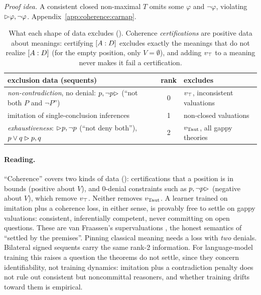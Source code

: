 \noindent\emph{Proof idea.} A consistent closed non-maximal $T$ omits some $\varphi$ and $\neg\varphi$, violating $\rhd\varphi,\neg\varphi$. Appendix~\ref{app:coherence:carnap}.

\begin{table}[t]
\centering\small
\begin{tabularx}{\textwidth}{@{}Xcl@{}}
\toprule
exclusion data (sequents) & rank & excludes\\
\midrule
\emph{non-contradiction}, no denial: $p,\neg p\rhd$ (``not both $P$ and $\neg P$'') & 0 & $v_{\top}$, inconsistent valuations\\
imitation of single-conclusion inferences & 1 & non-closed valuations\\
\emph{exhaustiveness}: $\rhd p,\neg p$ (``not deny both''), $p\vee q\rhd p,q$ & 2 & $v_{\mathrm{Taut}}$, all gappy theories\\
\bottomrule
\end{tabularx}
\caption{What each shape of data excludes (). Coherence \emph{certifications} are positive data about meanings: certifying $[A : D]$ excludes exactly the meanings that do not realize $[A : D]$ (for the empty position, only $V=\emptyset$), and adding $v_{\top}$ to a meaning never makes it fail a certification.}
\label{tab:coherence:rank}
\end{table}

\paragraph{Reading.} ``Coherence'' covers two kinds of data (): certifications that a position is in bounds (positive about $V$), and 0-denial constraints such as $p,\neg p\rhd$ (negative about $V$), which remove $v_{\top}$. Neither removes $v_{\mathrm{Taut}}$. A learner trained on imitation plus a coherence loss, in either sense, is provably free to settle on gappy valuations: consistent, inferentially competent, never committing on open questions. These are van Fraassen's supervaluations \citep{vanfraassen1966singular}, the honest semantics of ``settled by the premises''. Pinning classical meaning needs a loss with \emph{two} denials. Bilateral signed sequents \citep{smiley1996rejection,rumfitt2000yes} carry the same rank-2 information. For language-model training this raises a question the theorems do not settle, since they concern identifiability, not training dynamics: imitation plus a contradiction penalty does not rule out consistent but noncommittal reasoners, and whether training drifts toward them is empirical.

